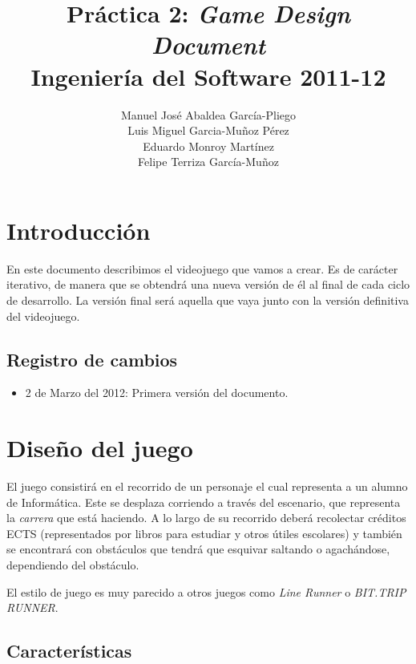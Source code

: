 \documentclass[12 pt, a4paper, twoside]{article}
\title{Práctica 2: {\em Game Design Document}\\Ingeniería del Software 2011-12}
\author{Manuel José Abaldea García-Pliego\\
Luis Miguel Garcia-Muñoz Pérez\\
Eduardo Monroy Martínez\\
Felipe Terriza García-Muñoz}
\date{}
\begin{document}
\maketitle

%


\section{Introducción}

En este documento describimos el videojuego que vamos a crear. Es de carácter
iterativo, de manera que se obtendrá una nueva versión de él al final de cada
ciclo de desarrollo. La versión final será aquella que vaya junto con la
versión definitiva del videojuego.

\subsection{Registro de cambios}

\begin{itemize}
  \item 2 de Marzo del 2012: Primera versión del documento.
\end{itemize}

\section{Diseño del juego}

El juego consistirá en el recorrido de un personaje el cual representa a un
alumno de Informática. Este se desplaza corriendo a través del escenario, que
representa la {\em carrera} que está haciendo. A lo largo de su recorrido
deberá recolectar créditos ECTS (representados por libros para estudiar y otros
útiles escolares) y también se encontrará con obstáculos que tendrá que
esquivar saltando o agachándose, dependiendo del obstáculo.

El estilo de juego es muy parecido a otros juegos como {\em Line Runner} o {\em
BIT.TRIP RUNNER}.

\subsection{Características}
\end{document}
